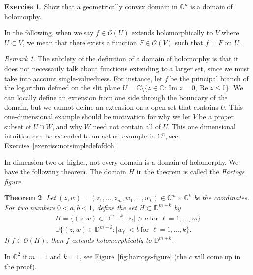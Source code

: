 \documentclass[12pt,openany]{book}
\renewcommand{\Re}{\operatorname{Re}}
\renewcommand{\Im}{\operatorname{Im}}
\newcommand{\sabs}[1]{\lvert {#1} \rvert}
\newcommand{\C}{{\mathbb{C}}}
\newcommand{\D}{{\mathbb{D}}}
\newcommand{\sO}{{\mathscr{O}}}
\newcommand{\myindex}[1]{#1\index{#1}}
\theoremstyle{plain}
\newtheorem{thm}{Theorem}[section]
\theoremstyle{remark}
\newtheorem{remark}[thm]{Remark}
\theoremstyle{definition}
\newenvironment{exbox}{%
    \def\FrameCommand{\vrule width 1pt \relax\hspace{10pt}}%
    \MakeFramed{\advance\hsize-\width\FrameRestore}%
}{%
    \endMakeFramed
}
\theoremstyle{exercise}
\newtheorem{exercise}{Exercise}[section]
\theoremstyle{example}
\newcommand{\figureref}[1]{\hyperref[#1]{Figure~\ref*{#1}}}
\newcommand{\exerciseref}[1]{\hyperref[#1]{Exercise~\ref*{#1}}}
\begin{document}
\begin{exbox}
\begin{exercise}
Show that a geometrically convex domain in $\C^n$ is a domain of holomorphy.
\end{exercise}
\end{exbox}

In the following, when we say $f \in \sO(U)$ extends holomorphically to $V$ where
$U \subset V$, we mean that there
exists a function $F \in \sO(V)$ such that $f = F$ on
$U$.

\begin{remark} \label{remark:notsimpledefofdoh}
The subtlety of the definition of a domain of holomorphy is that it does not
necessarily talk about functions extending to a larger set, since we must
take into account single-valuedness.  For instance, let $f$ be the principal branch
of the logarithm defined on the slit plane
$U = \C \setminus \{ z \in \C : \Im z = 0, \Re z \leq 0 \}$.
We can locally define an extension from one side through the boundary
of the domain, but we cannot define an extension on a open set that
contains $U$.  This one-dimensional example should be motivation for why we let $V$
be a proper subset of $U \cap W$, and why $W$ need not contain all of $U$.
This one dimensional intuition can be extended to an actual example in
$\C^n$, see \exerciseref{exercise:notsimpledefofdoh}.
\end{remark}

In dimension two or higher, not every domain is a domain of holomorphy.  We have
the following theorem.  The domain $H$ in the theorem is called the
\emph{\myindex{Hartogs figure}}.

\begin{thm} \label{thm:extensionhartogsfigure}
Let $(z,w) = (z_1,\ldots,z_m,w_{1},\ldots,w_{k}) \in \C^m \times \C^k$ be the coordinates.  For two numbers
$0 < a,b < 1$, define the set $H \subset \D^{m+k}$
by
\begin{multline*}
H = \bigl\{ (z,w) \in \D^{m+k} : \sabs{z_\ell} > a ~\text{for $\ell=1,\ldots,m$}
\bigr\}
\\
\cup
\bigl\{ (z,w) \in \D^{m+k} : \sabs{w_\ell} < b ~\text{for $\ell=1,\ldots,k$}
\bigr\} .
\end{multline*}
If $f \in \sO(H)$, then $f$ extends holomorphically to $\D^{m+k}$.
\end{thm}

In $\C^2$ if $m=1$ and $k=1$, see
\figureref{fig:hartogs-figure} (the $c$ will come up in
the proof).
\end{document}
